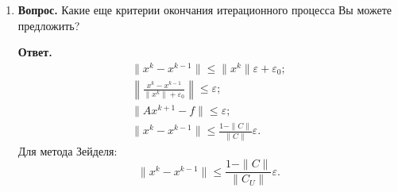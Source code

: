 \documentclass[12pt, a4paper]{article}
\begin{document}
\begin{enumerate}
 	\item  \textbf{Вопрос.} Какие еще критерии окончания итерационного процесса Вы можете предложить?
 	
 	 \textbf{Ответ.}
 	\begin{gather*}
 		\| x^k - x^{k - 1} \| \leq \| x^k\| \varepsilon + \varepsilon_0; \\
 		\left\| \frac{ x^k - x^{k - 1}}{\| x^k \| + \varepsilon_0} \right\| \leq \varepsilon; \\
 		 		\| A x^{k + 1} - f \| \leq \varepsilon; \\
 		\| x^k - x^{k - 1}\| \leq \frac{1 - \| C \|}{\| C \|} \varepsilon. 
 	\end{gather*}
 	Для метода Зейделя:
 	$$\| x^k - x^{k - 1} \| \leq \frac{1-\| C \|}{\| C_U \|} \varepsilon.$$
 	
  	
  	
		\end{enumerate}

	
\end{document}

